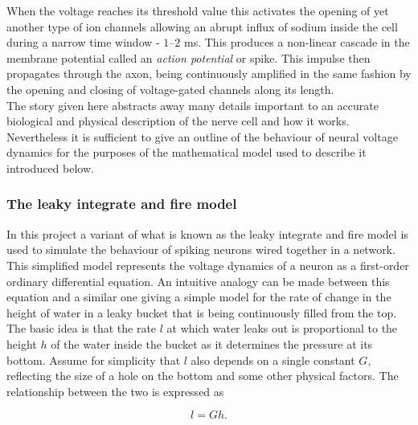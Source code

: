 \documentclass[12pt]{extarticle}
\begin{document}
\noindent
When the voltage reaches its threshold value this activates the
opening of yet another type of ion channels allowing an abrupt influx
of sodium inside the cell during a narrow time window - $1$--$2$
ms. This produces a non-linear cascade in the membrane potential
called an \textit{action potential} or spike. This impulse then
propagates through the axon, being continuously amplified in the same
fashion by the opening and closing of voltage-gated channels along its
length.\\

\noindent
The story given here abstracts away many details important to an
accurate biological and physical description of the nerve cell and how
it works. Nevertheless it is sufficient to give an outline of the
behaviour of neural voltage dynamics for the purposes of the
mathematical model used to describe it introduced below.\\

\subsubsection*{The leaky integrate and fire model}


\noindent
In this project a variant of what is known as the leaky integrate and
fire model \cite{Lapique} is used to simulate the behaviour of spiking
neurons wired together in a network. This simplified model represents
the voltage dynamics of a neuron as a first-order ordinary
differential equation. An intuitive analogy can be made between this
equation and a similar one giving a simple model for the rate of
change in the height of water in a leaky bucket that is being
continuously filled from the top.\\

\noindent
The basic idea is that the rate $l$ at which water leaks out is
proportional to the height $h$ of the water inside the bucket as it
determines the pressure at its bottom. Assume for simplicity that $l$
also depends on a single constant $G$, reflecting the size of a hole
on the bottom and some other physical factors. The relationship
between the two is expressed as

\begin{equation}
l = Gh.
\end{equation}
\end{document}
